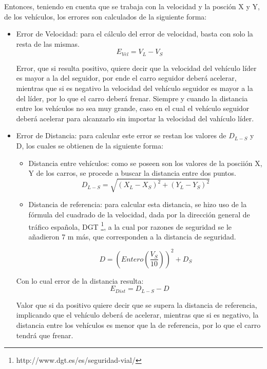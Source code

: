 \par Entonces, teniendo en cuenta que se trabaja con la velocidad y la posción X y Y, de los vehículos, los errores son calculados de la siguiente forma:

\begin{itemize}
\item Error de Velocidad: para el cálculo del error de velocidad, basta con solo la resta de las mismas.
\begin{equation} \label{eq: errvel}
E_{Vel} = V_{L} - V_{S}
\end{equation}
\par Error, que si resulta positivo, quiere decir que la velocidad del vehículo líder es mayor a la del seguidor, por ende el carro seguidor deberá acelerar, mientras que si es negativo la velocidad del vehículo seguidor es mayor a la del líder, por lo que el carro deberá frenar. Siempre y cuando la distancia entre los vehículos no sea muy grande, caso en el cual el vehículo seguidor deberá acelerar para alcanzarlo sin importar la velocidad del vahículo líder.
\item Error de Distancia: para calcular este error se restan los valores de $D_{L-S}$ y D, los cuales se obtienen de la siguiente forma:
\begin{itemize}
\item Distancia entre vehículos: como se poseen son los valores de la posciión X, Y de los carros, se procede a buscar la distancia entre dos puntos.
\begin{equation} \label{eq: distv}
D_{L-S} = \sqrt{(X_{L}-X_{S})^{2} + (Y_{L}-Y_{S})^{2}}
\end{equation}

\item Distancia de referencia: para calcular esta distancia, se hizo uso de la fórmula del cuadrado de la velocidad, dada por la dirección general de tráfico española, DGT \footnote{http://www.dgt.es/es/seguridad-vial/}, a la cual por razones de seguridad se le añadieron 7 m más, que corresponden a la distancia de seguridad. 

\begin{equation} \label{eq: diss}
D = (Entero(\frac{V_{S}}{10}))^{2} + D_{S}
\end{equation}

\end{itemize}
\par Con lo cual error de la distancia resulta:
\begin{equation} \label{eq: errvel}
E_{Dist} = D_{L-S} - D
\end{equation}

\par Valor que si da positivo quiere decir que se supera la distancia de referencia, implicando que el vehículo deberá de acelerar, mientras que si es negativo, la distancia entre los vehículos es menor que la de referencia, por lo que el carro tendrá que frenar.

\end{itemize} 
